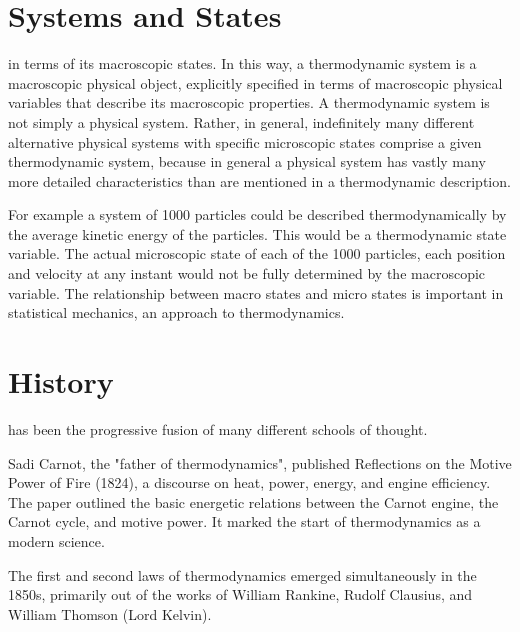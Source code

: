 \section{Systems and States}

 in terms of its macroscopic states. In this way, a thermodynamic system is a macroscopic physical object, explicitly specified in terms of macroscopic physical variables that describe its macroscopic properties. 
A thermodynamic system is not simply a physical system.  Rather, in general, indefinitely many different alternative physical systems with specific microscopic states comprise a given thermodynamic system, because in general a physical system has vastly many more detailed characteristics than are mentioned in a thermodynamic description.

For example a system of 1000 particles could be described thermodynamically by the average kinetic energy of the particles.  This would be a thermodynamic state variable.  The actual microscopic state of each of the 1000 particles, each position and velocity at any instant would not be fully determined by the macroscopic variable.  The relationship between macro states and micro states is important in statistical mechanics, an approach to thermodynamics.



\section{History}
 has been the progressive fusion of many different schools of thought.  

Sadi Carnot, the "father of thermodynamics", published Reflections on the Motive Power of Fire (1824), a discourse on heat, power, energy, and engine efficiency. The paper outlined the basic energetic relations between the Carnot engine, the Carnot cycle, and motive power. It marked the start of thermodynamics as a modern science.

The first and second laws of thermodynamics emerged simultaneously in the 1850s, primarily out of the works of William Rankine, Rudolf Clausius, and William Thomson (Lord Kelvin).

